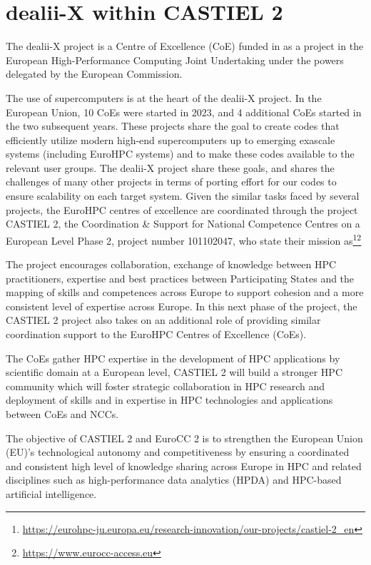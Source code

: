 \documentclass[a4paper,12pt]{article}
\begin{document}
\vspace*{2cm}

\disclaimer

\newpage


\newpage
\section{dealii-X within CASTIEL 2}

The dealii-X project is a Centre of Excellence (CoE) funded in as a project in
the European High-Performance Computing Joint Undertaking under the powers
delegated by the European Commission.

The use of supercomputers is at the heart of the dealii-X project. In the
European Union, 10 CoEs were started in 2023, and 4 additional CoEs started in
the two subsequent years. These projects share the goal to create codes that
efficiently utilize modern high-end supercomputers up to emerging exascale
systems (including EuroHPC systems) and to make these codes available to the
relevant user groups. The dealii-X project share these goals, and shares the
challenges of many other projects in terms of porting effort for our codes to
ensure scalability on each target system. Given the similar tasks faced by
several projects, the EuroHPC centres of excellence are coordinated through
the project CASTIEL 2, the Coordination \& Support for National Competence
Centres on a European Level Phase 2, project number 101102047, who state
their mission
as\footnote{\url{https://eurohpc-ju.europa.eu/research-innovation/our-projects/castiel-2_en}}\footnote{\url{https://www.eurocc-access.eu}}
\begin{center}
  \begin{minipage}{0.8\textwidth}
    The project encourages collaboration, exchange of knowledge between HPC
    practitioners, expertise and best practices between Participating States
    and the mapping of skills and competences across Europe to support
    cohesion and a more consistent level of expertise across Europe. In this
    next phase of the project, the CASTIEL 2 project also takes on an
    additional role of providing similar coordination support to the EuroHPC
    Centres of Excellence (CoEs).

    The CoEs gather HPC expertise in the development of HPC applications by
    scientific domain at a European level, CASTIEL 2 will build a stronger HPC
    community which will foster strategic collaboration in HPC research and
    deployment of skills and in expertise in HPC technologies and applications
    between CoEs and NCCs.
  \end{minipage}
  
  \begin{minipage}{0.8\textwidth}
    The objective of CASTIEL 2 and EuroCC 2 is to strengthen the European
    Union (EU)’s technological autonomy and competitiveness by ensuring a
    coordinated and consistent high level of knowledge sharing across Europe
    in HPC and related disciplines such as high-performance data analytics
    (HPDA) and HPC-based artificial intelligence.
  \end{minipage}
\end{center}
\end{document}
